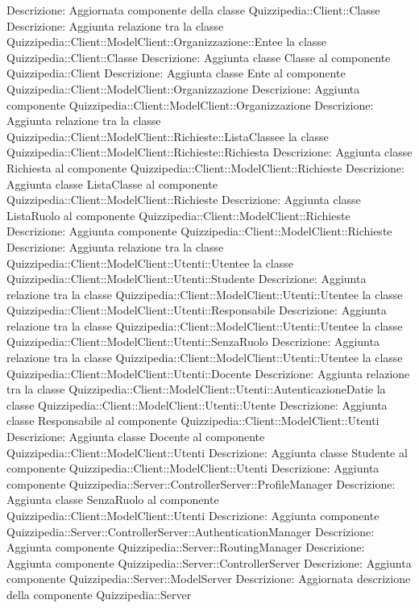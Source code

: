 Descrizione: Aggiornata componente della classe Quizzipedia::Client::Classe 
Descrizione: Aggiunta relazione tra la classe Quizzipedia::Client::ModelClient::Organizzazione::Entee la classe Quizzipedia::Client::Classe 
Descrizione: Aggiunta classe Classe al componente Quizzipedia::Client 
Descrizione: Aggiunta classe Ente al componente Quizzipedia::Client::ModelClient::Organizzazione 
Descrizione: Aggiunta componente Quizzipedia::Client::ModelClient::Organizzazione 
Descrizione: Aggiunta relazione tra la classe Quizzipedia::Client::ModelClient::Richieste::ListaClassee la classe Quizzipedia::Client::ModelClient::Richieste::Richiesta 
Descrizione: Aggiunta classe Richiesta al componente Quizzipedia::Client::ModelClient::Richieste 
Descrizione: Aggiunta classe ListaClasse al componente Quizzipedia::Client::ModelClient::Richieste 
Descrizione: Aggiunta classe ListaRuolo al componente Quizzipedia::Client::ModelClient::Richieste 
Descrizione: Aggiunta componente Quizzipedia::Client::ModelClient::Richieste 
Descrizione: Aggiunta relazione tra la classe Quizzipedia::Client::ModelClient::Utenti::Utentee la classe Quizzipedia::Client::ModelClient::Utenti::Studente 
Descrizione: Aggiunta relazione tra la classe Quizzipedia::Client::ModelClient::Utenti::Utentee la classe Quizzipedia::Client::ModelClient::Utenti::Responsabile 
Descrizione: Aggiunta relazione tra la classe Quizzipedia::Client::ModelClient::Utenti::Utentee la classe Quizzipedia::Client::ModelClient::Utenti::SenzaRuolo 
Descrizione: Aggiunta relazione tra la classe Quizzipedia::Client::ModelClient::Utenti::Utentee la classe Quizzipedia::Client::ModelClient::Utenti::Docente 
Descrizione: Aggiunta relazione tra la classe Quizzipedia::Client::ModelClient::Utenti::AutenticazioneDatie la classe Quizzipedia::Client::ModelClient::Utenti::Utente 
Descrizione: Aggiunta classe Responsabile al componente Quizzipedia::Client::ModelClient::Utenti 
Descrizione: Aggiunta classe Docente al componente Quizzipedia::Client::ModelClient::Utenti 
Descrizione: Aggiunta classe Studente al componente Quizzipedia::Client::ModelClient::Utenti 
Descrizione: Aggiunta componente Quizzipedia::Server::ControllerServer::ProfileManager 
Descrizione: Aggiunta classe SenzaRuolo al componente Quizzipedia::Client::ModelClient::Utenti 
Descrizione: Aggiunta componente Quizzipedia::Server::ControllerServer::AuthenticationManager 
Descrizione: Aggiunta componente Quizzipedia::Server::RoutingManager 
Descrizione: Aggiunta componente Quizzipedia::Server::ControllerServer 
Descrizione: Aggiunta componente Quizzipedia::Server::ModelServer 
Descrizione: Aggiornata descrizione della componente Quizzipedia::Server 
